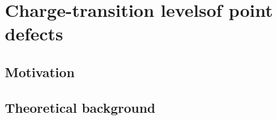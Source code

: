\cleardoublepage
\chapter[Charge-transition levels of point defects]{Charge-transition levels\break of point defects\label{ch:defects}}

\section{Motivation}

\section{Theoretical background}





